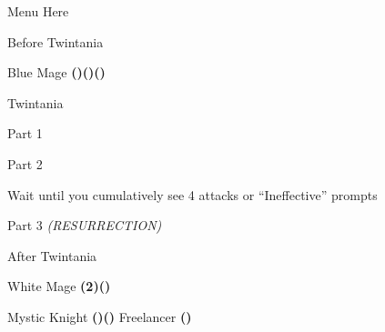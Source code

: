 \begin{paracol}{2}
\begin{misc}{Menu Here}
\end{misc}

\switchcolumn
\begin{menu}{Before Twintania}
    \varwb
    \begin{itemMenu}
        \maidensKissMenu {}
    \end{itemMenu}
    \begin{abilityMenu}
        \bartz {} \optimize
    \end{abilityMenu}
    \begin{jobMenu}
        \lenna Blue Mage \textbf{(\pointDown)(\pointLeft)(\pointDown)}
    \end{jobMenu}
    \varwe
\end{menu}

\begin{boss}{Twintania}
    \varwb
    \begin{bossPart}{Part 1}
        \bartz \leftCommand{\hide}
    \end{bossPart}
    \begin{bossPart}{Part 2}
        \item Wait until you cumulatively see 4 attacks or “Ineffective” prompts
        \bartz \leftCommand{\showAbility}
    \end{bossPart}
    \begin{bossPart}{Part 3}
        \bartz \rightCommand{\combine} \then \battleGroup{\hiPotion \space + \phoenixDown} \textit{(RESURRECTION)} \then {} 
        \item {}
        \item {}
        \lenna \leftCommand{\blue} \then \lfiveDeath
    \end{bossPart}
    \varwe
\end{boss}

\switchcolumnTwice[*]
\begin{menu}{After Twintania}
    \varwb
    \begin{jobMenu}
        \lenna White Mage \textbf{(2\pointRight)(\pointDown)}
    \end{jobMenu}
    \begin{itemMenu}
        \elixirMenu {}
    \end{itemMenu}
    \begin{magicMenu}
        \lenna \life \space \then {}
    \end{magicMenu}
    \begin{jobMenu}
        \lenna Mystic Knight \textbf{(\pointRight)(\pointDown)} \optimize
        \faris Freelancer \textbf{(\pointLeft)} 
    \end{jobMenu}
    \begin{abilityMenu}
        \bartz {} \optimize
    \end{abilityMenu}
    \varwe
\end{menu}


\end{paracol}
